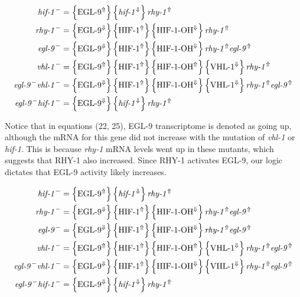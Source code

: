 \documentclass{article}
\newcommand{\transcr}[1]{\left \{ #1 \right \}}
\newcommand{\gene}[1]{\textrm{\emph{#1}}}
\newcommand{\mrna}[1]{\textrm{\emph{#1}}}
\newcommand{\protein}[1]{\textrm{#1}}
\theoremstyle{definition}
\begin{document}
\begin{align}
  \gene{hif-1}^- &= \transcr{\protein{EGL-9}^\Uparrow}\transcr{\gene{hif-1}^\Downarrow}\gene{rhy-1}^\Uparrow \\
  \gene{rhy-1}^- &= \transcr{\protein{EGL-9}^\Downarrow}\transcr{\protein{HIF-1}^\Uparrow}\transcr{\protein{HIF-1-OH}^\Downarrow}\mrna{rhy-1}^\Uparrow \\
  \gene{egl-9}^- &= \transcr{\protein{EGL-9}^\Downarrow}\transcr{\protein{HIF-1}^\Uparrow}\transcr{\protein{HIF-1-OH}^\Downarrow}\mrna{rhy-1}^\Uparrow\mrna{egl-9}^\Uparrow \\
  \gene{vhl-1}^- &= \transcr{\protein{EGL-9}^\Uparrow}\transcr{\protein{HIF-1}^\Uparrow}\transcr{\protein{HIF-1-OH}^\Uparrow}\transcr{\protein{VHL-1}^\Downarrow}\mrna{rhy-1}^\Uparrow \\
  \gene{egl-9}^-\gene{vhl-1}^- &= \transcr{\protein{EGL-9}^\Downarrow}\transcr{\protein{HIF-1}^\Uparrow}\transcr{\protein{HIF-1-OH}^\Downarrow}\transcr{\protein{VHL-1}^\Downarrow}\mrna{rhy-1}^\Uparrow\mrna{egl-9}^\Uparrow \\
  \gene{egl-9}^-\gene{hif-1}^- &= \transcr{\protein{EGL-9}^\Downarrow}\transcr{\gene{hif-1}^\Downarrow}\mrna{rhy-1}^\Uparrow
\end{align}

Notice that in equations (22, 25), \protein{EGL-9} transcriptome is denoted as going up, although the mRNA for this gene did not increase with the mutation of \gene{vhl-1} or \gene{hif-1}. This is because \gene{rhy-1} mRNA levels went up in these mutants, which suggests that \protein{RHY-1} also increased. Since \protein{RHY-1} activates \protein{EGL-9}, our logic dictates that \protein{EGL-9} activity likely increases.

\begin{align}
  \gene{hif-1}^- &= \transcr{\protein{EGL-9}^\Uparrow}\transcr{\gene{hif-1}^\Downarrow}\gene{rhy-1}^\Uparrow \\
  \gene{rhy-1}^- &= \transcr{\protein{EGL-9}^\Downarrow}\transcr{\protein{HIF-1}^\Uparrow}\transcr{\protein{HIF-1-OH}^\Downarrow}\mrna{rhy-1}^\Uparrow\mrna{egl-9}^\Uparrow \\
  \gene{egl-9}^- &= \transcr{\protein{EGL-9}^\Downarrow}\transcr{\protein{HIF-1}^\Uparrow}\transcr{\protein{HIF-1-OH}^\Downarrow}\mrna{rhy-1}^\Uparrow\mrna{egl-9}^\Uparrow \\
  \gene{vhl-1}^- &= \transcr{\protein{EGL-9}^\Uparrow}\transcr{\protein{HIF-1}^\Uparrow}\transcr{\protein{HIF-1-OH}^\Uparrow}\transcr{\protein{VHL-1}^\Downarrow}\mrna{rhy-1}^\Uparrow\mrna{egl-9}^\Uparrow \\
  \gene{egl-9}^-\gene{vhl-1}^- &= \transcr{\protein{EGL-9}^\Downarrow}\transcr{\protein{HIF-1}^\Uparrow}\transcr{\protein{HIF-1-OH}^\Downarrow}\transcr{\protein{VHL-1}^\Downarrow}\mrna{rhy-1}^\Uparrow\mrna{egl-9}^\Uparrow \\
  \gene{egl-9}^-\gene{hif-1}^- &= \transcr{\protein{EGL-9}^\Downarrow}\transcr{\gene{hif-1}^\Downarrow}\mrna{rhy-1}^\Uparrow
\end{align}
\end{document}
